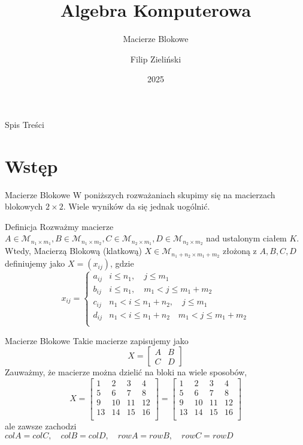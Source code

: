 \documentclass{beamer}
\title{Algebra Komputerowa}
\subtitle{Macierze Blokowe}
\author{Filip Zieli\'nski}
\date{2025}
\begin{document}
\begin{frame}
\titlepage
\end{frame}
 
\begin{frame}{Spis Treści}
    \tableofcontents
\end{frame}

\section{Wstęp} 

\begin{frame}{Macierze Blokowe}
    W poniższych rozważaniach skupimy się na macierzach blokowych $2 \times 2$. Wiele wyników da się jednak uogólnić.
    \begin{block}{Definicja}
        Rozważmy macierze $A \in \mathcal{M}_{n_1 \times m_1}, B \in \mathcal{M}_{n_1 \times m_2}, C \in \mathcal{M}_{n_2 \times m_1}, D \in \mathcal{M}_{n_2 \times m_2}$ nad ustalonym ciałem $K$.
        Wtedy, \alert{Macierzą Blokową} (klatkową) $X \in \mathcal{M}_{n_1 + n_2 \times m_1 + m_2}$ złożoną z  $A,B,C,D$ definiujemy jako $X = (x_{ij})$, gdzie 
        $$x_{ij} = \begin{cases}
            a_{ij} & i \leq n_1 , \quad  j \leq m_1 \\ 
            b_{ij} &  i \leq n_1 , \quad m_1 < j \leq m_1 + m_2 \\
            c_{ij} & n_1 < i \leq n_1 + n_2, \quad j \leq m_1 \\
            d_{ij} & n_1 < i \leq n_1 + n_2 \quad  m_1 < j \leq m_1 + m_2 \\
        \end{cases}$$
    \end{block}    
\end{frame}

\begin{frame}{Macierze Blokowe}
    Takie macierze zapisujemy jako
    $$ X = \begin{bmatrix}
        A & B \\
        C & D
    \end{bmatrix}$$
    Zauważmy, że macierze można dzielić na bloki na wiele sposobów, 
    $$X = \left[ \begin{array}{ccc|c}
        1 & 2 & 3 & 4 \\ \hline 
        5 & 6 & 7 & 8 \\ 
        9 & 10 & 11 & 12 \\ 
        13 & 14 & 15 & 16 \\
    \end{array}\right] =  \left[ \begin{array}{cc|cc}
        1 & 2 & 3 & 4 \\ 
        5 & 6 & 7 & 8 \\ \hline 
        9 & 10 & 11 & 12 \\ 
        13 & 14 & 15 & 16 \\
    \end{array}\right] $$
    ale zawsze zachodzi $colA = colC, \quad colB = colD,\quad  rowA = rowB, \quad rowC = rowD$
\end{frame}
\end{document}
